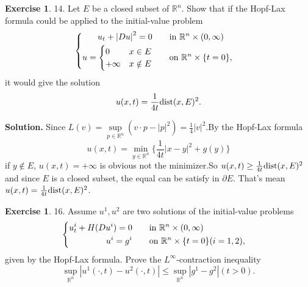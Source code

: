\documentclass[a4paper]{book}
\newenvironment{solution}%
{\noindent\textbf{Solution.}}%
{\qedhere}
\numberwithin{equation}{chapter}
\theoremstyle{definition}
\newtheorem{exc}[exm]{Exercise}
\begin{document}
\begin{exc}
  14.  Let $E$ be a closed subset of $\mathbb{R}^n$. Show that if the Hopf-Lax formula could be applied to the initial-value problem
  \begin{equation*}
    \begin{cases}
      \begin{aligned}
        u_t + \left| Du \right|^2 = 0 \qquad &\textmd{in } \mathbb{R}^n \times (0,\infty) \\
        u =
        \begin{cases}
          0   &x \in E \\
          +\infty &x \notin E
        \end{cases} \qquad &\textmd{on } \mathbb{R}^n \times \{t = 0\},

      \end{aligned}
    \end{cases}
  \end{equation*}
  it would give the solution
  \[u(x,t) = \frac{1}{4t} \textmd{dist}(x,E)^2.\]
\end{exc}

\begin{solution}
  Since $L(v) = \sup\limits_{p \in \mathbb{R}^n}(v \cdot p - \left| p \right|^2) = \frac{1}{4}\left| v \right|^2$.By the Hopf-Lax formula
  \begin{equation*}
    u(x,t) = \min\limits_{y \in \mathbb{R}^n}\{\frac{1}{4t}\left| x - y \right|^2 + g(y)\}
  \end{equation*}
  if $y \notin E$, $u(x,t) = +\infty$ is obvious not the minimizer.So $u(x,t) \geq \frac{1}{4t} \textmd{dist}(x,E)^2$ and since $E$ is a closed subset, the equal can be satisfy in $\partial E$. That's mean $u(x,t) = \frac{1}{4t} \textmd{dist}(x,E)^2$.
\end{solution}


\begin{exc}
  16.  Assume $u^1,u^2$ are two solutions of the initial-value problems
  \begin{equation*}
    \begin{cases}
      \begin{aligned}
        u_t^i + H(Du^i) = 0 \qquad &\textmd{in } \mathbb{R}^n \times (0, \infty) \\
        u^i = g^i \qquad &\textmd{on } \mathbb{R}^n \times \{t = 0\} (i = 1,2),
      \end{aligned}
    \end{cases}
  \end{equation*}
  given by the Hopf-Lax formula. Prove the $L^\infty$-contraction inequality
  \[\sup\limits_{\mathbb{R}^n} \left| u^1(\cdot,t) - u^2(\cdot,t) \right| \leq \sup\limits_{\mathbb{R}^n}\left| g^1 - g^2 \right| (t > 0).\]
\end{exc}
\end{document}
